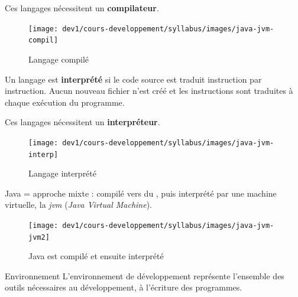 \begin{hideedit}
\begin{frame}
  Ces langages nécessitent un \textbf{compilateur}. 

  \begin{figure}[h]
  \begin{center}
  \texttt{[image: dev1/cours-developpement/syllabus/images/java-jvm-compil]}
  \caption{Langage compilé}
  \label{compilé}
  \end{center}
  \end{figure}
\end{frame}

\begin{frame}
  \begin{definition}
    Un langage est \textbf{interprété} si le code source est traduit
    instruction par instruction. Aucun nouveau fichier n'est créé et les
    instructions sont traduites à chaque exécution du programme.
  \end{definition}

  Ces langages nécessitent un \textbf{interpréteur}.

  \begin{figure}[h]
  \begin{center}
  \texttt{[image: dev1/cours-developpement/syllabus/images/java-jvm-interp]}
  \caption{Langage interprété}
  \label{interprété}
  \end{center}
  \end{figure}
\end{frame}

\begin{frame}
  Java = approche mixte : compilé vers du , puis
  interprété par une machine virtuelle, la
  \textit{jvm}  (\textit{Java Virtual Machine}).

  \bigskip
  \begin{figure}[h]
  \begin{center}
  \texttt{[image: dev1/cours-developpement/syllabus/images/java-jvm-jvm2]}

  \caption{Java est compilé et ensuite interprété}
  \label{jvm}
  \end{center}
  \end{figure}
\end{frame}

\begin{frame}{Environnement}
  L'environnement de développement représente l'ensemble des outils
  nécessaires au développement, à l'écriture des programmes.


\end{frame}
\end{hideedit}
